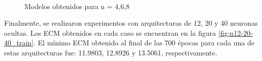 \documentclass[a4paper]{article}
\begin{document}
	\begin{figure}[H]
	\centering
	\\
	\caption{Modelos obtenidos para n = 4,6,8}
	\label{f:aprox4-6-8}
	\end{figure}

Finalmente, se realizaron experimentos con arquitecturas de 12, 20 y 40 neuronas ocultas. Los ECM obtenidos en cada caso se encuentran en la figura \ref{fig:n12-20-40_train}. El mínimo ECM obtenido al final de las 700 épocas para cada una de estas arquitecturas fue: 11.9803, 12.8926 y 13.5061, respectivamente.
	
\end{document}
